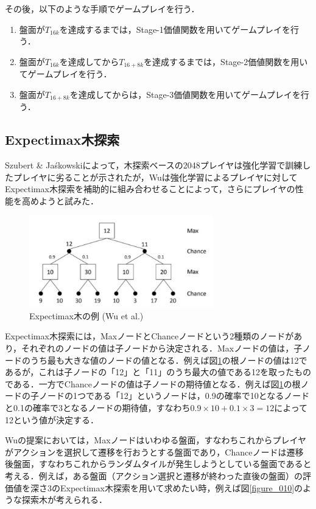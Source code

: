 \documentclass{suribt}
\begin{document}
その後，以下のような手順でゲームプレイを行う．

\begin{enumerate}
\item 盤面が$T_{16k}$を達成するまでは，Stage-1価値関数を用いてゲームプレイを行う．
\item 盤面が$T_{16k}$を達成してから$T_{16+8k}$を達成するまでは，Stage-2価値関数を用いてゲームプレイを行う．
\item 盤面が$T_{16+8k}$を達成してからは，Stage-3価値関数を用いてゲームプレイを行う．
\end{enumerate}

\subsection{Expectimax木探索}
Szubert \& Ja\'{s}kowskiによって，木探索ベースの2048プレイヤは強化学習で訓練したプレイヤに劣ることが示されたが，Wuは強化学習によるプレイヤに対してExpectimax木探索を補助的に組み合わせることによって，さらにプレイヤの性能を高めようと試みた．

\begin{figure}[t]
	\begin{center}
	\includegraphics[width=8cm]{figure_003.png}
	\caption{Expectimax木の例 (Wu et al.)}
	\label{figure_003}
	\end{center}
\end{figure}

Expectimax木探索には，MaxノードとChanceノードという2種類のノードがあり，それぞれのノードの値は子ノードから決定される．Maxノードの値は，子ノードのうち最も大きな値のノードの値となる．例えば図\ref{figure_003}の根ノードの値は12であるが，これは子ノードの「12」と「11」のうち最大の値である12を取ったものである．一方でChanceノードの値は子ノードの期待値となる．例えば図\ref{figure_003}の根ノードの子ノードの1つである「12」というノードは，0.9の確率で10となるノードと0.1の確率で3となるノードの期待値，すなわち$0.9 \times 10 + 0.1 \times 3 = 12$によって12という値が決定する．

Wuの提案においては，Maxノードはいわゆる盤面，すなわちこれからプレイヤがアクションを選択して遷移を行おうとする盤面であり，Chanceノードは遷移後盤面，すなわちこれからランダムタイルが発生しようとしている盤面であると考える．例えば，ある盤面（アクション選択と遷移が終わった直後の盤面）の評価値を深さ3のExpectimax木探索を用いて求めたい時，例えば図\ref{figure_010}のような探索木が考えられる．
\end{document}
